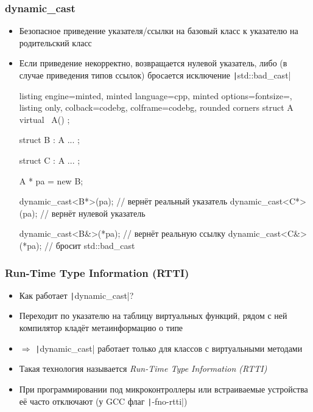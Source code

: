 \documentclass[10pt]{beamer}
\begin{document}
\begin{frame}[fragile]
\frametitle{dynamic\_cast}
\begin{itemize}
\item Безопасное приведение указателя/ссылки на базовый класс к указателю на родительский класс
\pause
\item Если приведение некорректно, возвращается нулевой указатель, либо (в случае приведения типов ссылок) бросается исключение \texttt|std::bad_cast|
\pause
{}
\begin{tcblisting}{listing engine=minted, minted language=cpp, minted options={fontsize=\scriptsize}, listing only, colback=codebg, colframe=codebg, rounded corners}
struct A {
  virtual ~A() {}
};

struct B : A { ... };

struct C : A { ... };

A * pa = new B;

dynamic_cast<B*>(pa); // вернёт реальный указатель
dynamic_cast<C*>(pa); // вернёт нулевой указатель

dynamic_cast<B&>(*pa); // вернёт реальную ссылку
dynamic_cast<C&>(*pa); // бросит std::bad_cast
\end{tcblisting}
\end{itemize}
\end{frame}

\begin{frame}[fragile]
\frametitle{Run-Time Type Information (RTTI)}
\begin{itemize}
\item Как работает \texttt|dynamic_cast|?
\pause
\item Переходит по указателю на таблицу виртуальных функций, рядом с ней компилятор кладёт метаинформацию о типе
\pause
\item \(\Longrightarrow\) \texttt|dynamic_cast| работает только для классов с виртуальными методами
\pause
\item Такая технология называется \textit{Run-Time Type Information (RTTI)}
\pause
\item При программировании под микроконтроллеры или встраиваемые устройства её часто отключают (у GCC флаг \texttt|-fno-rtti|)
\end{itemize}
\end{frame}
\end{document}
